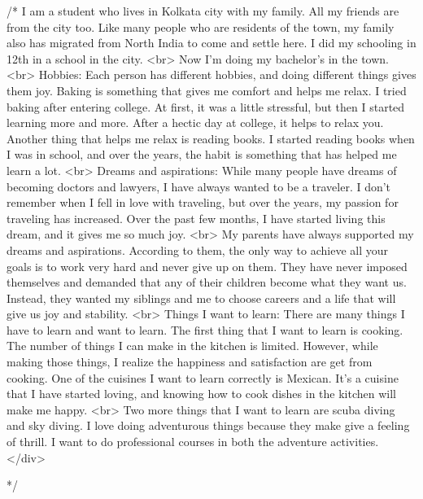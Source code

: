 /*
I am a student who lives in Kolkata city with my family. All my friends are from the city too. Like many people who are residents of the town, my family also has migrated from North India to come and settle here. I did my schooling in 12th in a school in the city.
                <br>
                Now I’m doing my bachelor’s in the town.
                <br>
                Hobbies: Each person has different hobbies, and doing different things gives them joy. Baking is something that gives me comfort and helps me relax. I tried baking after entering college. At first, it was a little stressful, but then I started learning more and more. After a hectic day at college, it helps to relax you. Another thing that helps me relax is reading books. I started reading books when I was in school, and over the years, the habit is something that has helped me learn a lot.
                <br>
                Dreams and aspirations: While many people have dreams of becoming doctors and lawyers, I have always wanted to be a traveler. I don’t remember when I fell in love with traveling, but over the years, my passion for traveling has increased. Over the past few months, I have started living this dream, and it gives me so much joy.
                <br>
                My parents have always supported my dreams and aspirations. According to them, the only way to achieve all your goals is to work very hard and never give up on them. They have never imposed themselves and demanded that any of their children become what they want us. Instead, they wanted my siblings and me to choose careers and a life that will give us joy and stability.
                <br>
                Things I want to learn: There are many things I have to learn and want to learn. The first thing that I want to learn is cooking. The number of things I can make in the kitchen is limited. However, while making those things, I realize the happiness and satisfaction are get from cooking. One of the cuisines I want to learn correctly is Mexican. It’s a cuisine that I have started loving, and knowing how to cook dishes in the kitchen will make me happy.
                <br>
                Two more things that I want to learn are scuba diving and sky diving. I love doing adventurous things because they make give a feeling of thrill. I want to do professional courses in both the adventure activities.
            </div>

            */